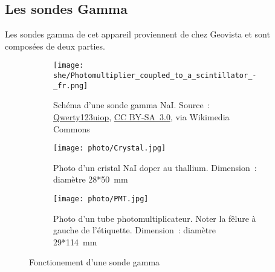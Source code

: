 \subsection{Les sondes Gamma}
\label{ssec_sonde}
Les sondes gamma de cet appareil proviennent de chez Geovista et sont composées de deux parties.
\begin{figure}

    \begin{subfigure}{1\textwidth}
        \centering
        \texttt{[image: she/Photomultiplier\_coupled\_to\_a\_scintillator\_-\_fr.png]}
        \caption[Shema d'une sonde gamma NaI]{Schéma d'une sonde gamma NaI. Source~: \href{https://commons.wikimedia.org/wiki/File:Photomultiplier_coupled_to_a_scintillator_-_fr.png}{Qwerty123uiop}, \href{https://creativecommons.org/licenses/by-sa/3.0}{CC BY-SA~3.0}, via Wikimedia Commons}
        \label{fig_detecteur_gamma}
    \end{subfigure}
    \begin{subfigure}[t]{0.5\textwidth}
        \centering
        \texttt{[image: photo/Crystal.jpg]}

        \caption[Photo d'un cristal NaI]{Photo d'un cristal NaI doper au thallium. Dimension~: diamètre 28*50~mm}
        \label{fig_Nai}
    \end{subfigure}
    \begin{subfigure}[t]{0.5\textwidth}
        \centering
        \texttt{[image: photo/PMT.jpg]}

        \caption[Photo d'un tube photomultiplicateur]{Photo d'un tube photomultiplicateur. Noter la fêlure à gauche de l'étiquette. Dimension~: diamètre 29*114~mm}
        \label{fig_PMT}
    \end{subfigure}
    \caption{Fonctionement d'une sonde gamma}

\end{figure}
